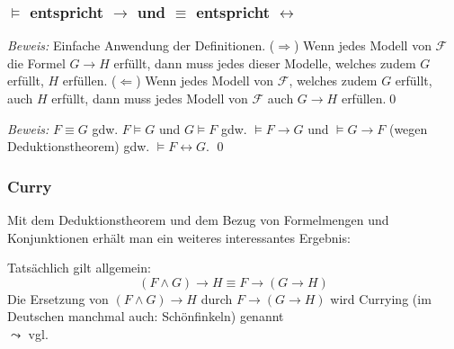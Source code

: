 \documentclass[aspectratio=1610,onlymath]{beamer}
\let\beameroriginaldoublebackslash\\
\let\\=\beameroriginaldoublebackslash
\begin{document}
\begin{frame}\frametitle{$\models$ entspricht $\to$ und $\equiv$ entspricht $\leftrightarrow$}

\pause

\emph{Beweis:} Einfache Anwendung der Definitionen.
($\Rightarrow$) Wenn jedes Modell von $\mathcal{F}$ die Formel $G\to H$ erfüllt, 
dann muss jedes dieser Modelle, welches zudem $G$ erfüllt, $H$ erfüllen.  ($\Leftarrow$) Wenn jedes Modell von $\mathcal{F}$, welches zudem $G$ erfüllt, auch $H$ erfüllt, dann muss jedes Modell von $\mathcal{F}$ auch $G\to H$ erfüllen.\qed\medskip\pause


\pause

\emph{Beweis:} $F\equiv G$ \alert{gdw.} $F\models G$ und $G\models F$ \alert{gdw.} $\models F\to G$ und $\models G\to F$ (wegen Deduktionstheorem) \alert{gdw.} $\models F\leftrightarrow G$. \qed

\end{frame}

\begin{frame}\frametitle{Curry}

Mit dem Deduktionstheorem und dem Bezug von Formelmengen und Konjunktionen erhält man ein weiteres interessantes
Ergebnis:\medskip

\medskip\pause

Tatsächlich gilt allgemein:
% 
\[ (F\wedge G)\to H\equiv F\to (G\to H)\]
% 
Die Ersetzung von $(F\wedge G)\to H$ durch $F\to (G\to H)$ wird \alert{Currying} (im Deutschen manchmal
auch: \alert{Schönfinkeln}) genannt\\
$\leadsto$ vgl. 

\end{frame}
\end{document}

